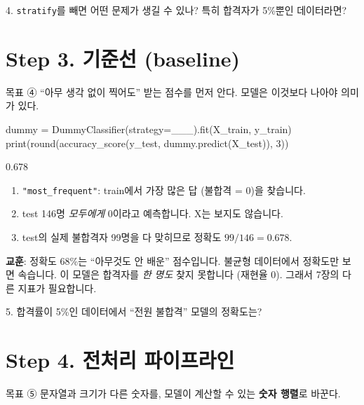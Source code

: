 \documentclass[11pt,a4paper]{article}
\newcommand{\code}[1]{\texttt{#1}}
\begin{document}
\begin{qbox}
4. \code{stratify}를 빼면 어떤 문제가 생길 수 있나? 특히 합격자가 5\%뿐인 데이터라면?
\end{qbox}

\section{Step 3. 기준선 (baseline)}
\begin{goalbox}{목표 \quad ④}
``아무 생각 없이 찍어도'' 받는 점수를 먼저 안다. 모델은 이것보다 나아야 의미가 있다.
\end{goalbox}

\begin{codebox}
dummy = DummyClassifier(strategy=\_\_\_).fit(X\_train, y\_train)\\
print(round(accuracy\_score(y\_test, dummy.predict(X\_test)), 3))
\end{codebox}
\begin{outbox}
0.678
\end{outbox}

\begin{howbox}
\begin{enumerate}
\item \code{"most\_frequent"}: train에서 가장 많은 답 (불합격 = 0)을 찾습니다.
\item test 146명 \emph{모두에게} 0이라고 예측합니다. X는 보지도 않습니다.
\item test의 실제 불합격자 99명을 다 맞히므로 정확도 $99/146=0.678$.
\end{enumerate}
\end{howbox}
\textbf{교훈}: 정확도 68\%는 ``아무것도 안 배운'' 점수입니다. 불균형 데이터에서 정확도만 보면 속습니다. 이 모델은 합격자를 \emph{한 명도} 찾지 못합니다 (재현율 0). 그래서 7장의 다른 지표가 필요합니다.

\begin{qbox}
5. 합격률이 5\%인 데이터에서 ``전원 불합격'' 모델의 정확도는?
\end{qbox}

\section{Step 4. 전처리 파이프라인}
\begin{goalbox}{목표 \quad ⑤}
문자열과 크기가 다른 숫자를, 모델이 계산할 수 있는 \textbf{숫자 행렬}로 바꾼다.
\end{goalbox}
\end{document}
